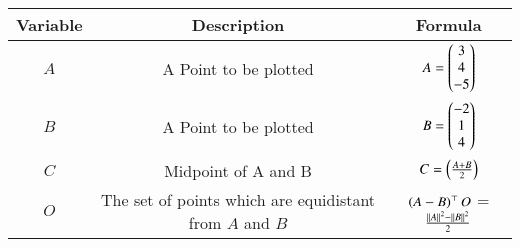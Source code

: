 \begin{center}
    \begin{tabular}{|c|c|c|} 
        \hline
            \textbf{Variable} & \textbf{Description} & \textbf{Formula} \\ 
        \hline
            $A$   & A Point to be plotted & $A = \begin{pmatrix}3 \\ 4\\-5\end{pmatrix}$ \\ 
        \hline
            $B$   &  A Point to be plotted &  $B = \begin{pmatrix}-2\\ 1\\4\end{pmatrix}$\\ 
        \hline
            $C$   & Midpoint of  A and B & $C  = \left(\frac{A+B}{2}\right)$\\ 
        \hline
            $O$   &The set of points which are equidistant from $A$ and $B$ & $\left(A-B\right)^\top O$ = $\frac{\left\vert\left\vert A\right\vert\right\vert^2-\left\vert\left\vert B\right\vert\right\vert^2}{2}$\\ 
        \hline
    \end{tabular}
\end{center}  




